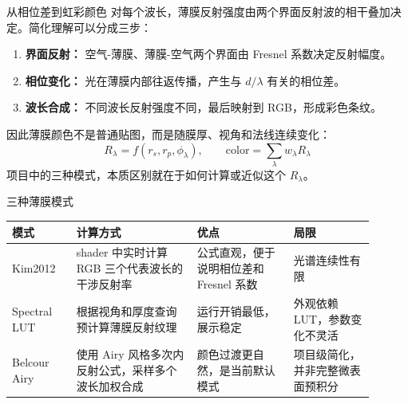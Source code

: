 \documentclass[11pt,aspectratio=169]{beamer}
\begin{document}
\begin{frame}{从相位差到虹彩颜色}
  对每个波长，薄膜反射强度由两个界面反射波的相干叠加决定。简化理解可以分成三步：
  \vspace{0.4em}
  \begin{enumerate}
    \item \textbf{界面反射：} 空气-薄膜、薄膜-空气两个界面由 Fresnel 系数决定反射幅度。
    \item \textbf{相位变化：} 光在薄膜内部往返传播，产生与 \(d/\lambda\) 有关的相位差。
    \item \textbf{波长合成：} 不同波长反射强度不同，最后映射到 RGB，形成彩色条纹。
  \end{enumerate}
  \vspace{0.4em}
  因此薄膜颜色不是普通贴图，而是随膜厚、视角和法线连续变化：
  \[
    R_{\lambda}=f(r_s,r_p,\phi_\lambda),
    \qquad
    \mathrm{color}=\sum_{\lambda} w_{\lambda}R_{\lambda}
  \]
  项目中的三种模式，本质区别就在于如何计算或近似这个 \(R_{\lambda}\)。
\end{frame}

\begin{frame}{三种薄膜模式}
  \begin{table}
    \centering
    \scriptsize
    \begin{tabular}{p{0.16\linewidth}p{0.30\linewidth}p{0.24\linewidth}p{0.20\linewidth}}
      \toprule
      模式 & 计算方式 & 优点 & 局限 \\
      \midrule
      Kim2012 & shader 中实时计算 RGB 三个代表波长的干涉反射率 & 公式直观，便于说明相位差和 Fresnel 系数 & 光谱连续性有限 \\
      Spectral LUT & 根据视角和厚度查询预计算薄膜反射纹理 & 运行开销最低，展示稳定 & 外观依赖 LUT，参数变化不灵活 \\
      Belcour Airy & 使用 Airy 风格多次内反射公式，采样多个波长加权合成 & 颜色过渡更自然，是当前默认模式 & 项目级简化，并非完整微表面预积分 \\
      \bottomrule
    \end{tabular}
  \end{table}
\end{frame}
\end{document}
